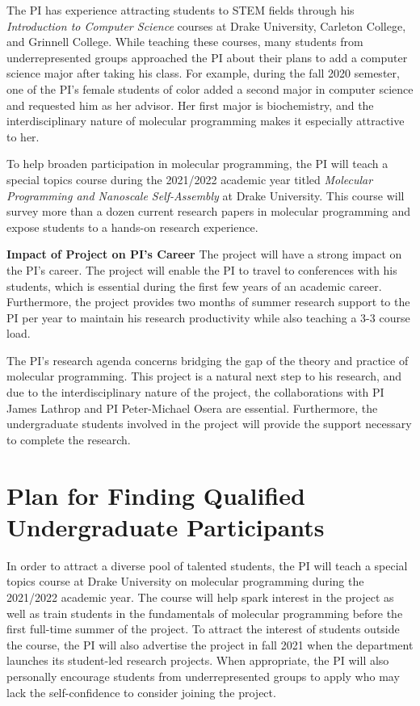 \documentclass[11pt]{article}
\begin{document}
    The PI has experience attracting students to STEM fields through his \emph{Introduction to Computer Science} courses at Drake University, Carleton College, and Grinnell College.
    While teaching these courses, many students from underrepresented groups approached the PI about their plans to add a computer science major after taking his class.
    For example, during the fall 2020 semester, one of the PI's female students of color added a second major in computer science and requested him as her advisor.
    Her first major is biochemistry, and the interdisciplinary nature of molecular programming makes it especially attractive to her.

    To help broaden participation in molecular programming, the PI will teach a special topics course during the 2021/2022 academic year titled \emph{Molecular Programming and Nanoscale Self-Assembly} at Drake University.
    This course will survey more than a dozen current research papers in molecular programming and expose students to a hands-on research experience.


    \textbf{Impact of Project on PI's Career}
    The project will have a strong impact on the PI's career.
    The project will enable the PI to travel to conferences with his students, which is essential during the first few years of an academic career.
    Furthermore, the project provides two months of summer research support to the PI per year to maintain his research productivity while also teaching a 3-3 course load.

    The PI's research agenda concerns bridging the gap of the theory and practice of molecular programming.
    This project is a natural next step to his research, and due to the interdisciplinary nature of the project, the collaborations with PI James Lathrop and PI Peter-Michael Osera are essential.
    Furthermore, the undergraduate students involved in the project will provide the support necessary to complete the research.

    \section{Plan for Finding Qualified Undergraduate Participants}
    In order to attract a diverse pool of talented students, the PI will teach a special topics course at Drake University on molecular programming during the 2021/2022 academic year.
    The course will help spark interest in the project as well as train students in the fundamentals of molecular programming before the first full-time summer of the project.
    To attract the interest of students outside the course, the PI will also advertise the project in fall 2021 when the department launches its student-led research projects.
    When appropriate, the PI will also personally encourage students from underrepresented groups to apply who may lack the self-confidence to consider joining the project.
\end{document}
